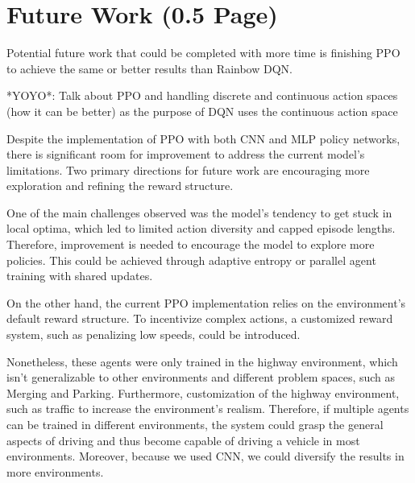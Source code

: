 \documentclass{article}
\begin{document}
\section{Future Work (0.5 Page)}


Potential future work that could be completed with more time is finishing PPO to achieve the same or better results than Rainbow DQN.

*YOYO*: Talk about PPO and handling discrete and continuous action spaces (how it can be better)
as the purpose of DQN uses the continuous action space 

Despite the implementation of PPO with both CNN and MLP policy networks, there is significant room for improvement to address the current model's limitations. Two primary directions for future work are encouraging more exploration and refining the reward structure.

One of the main challenges observed was the model's tendency to get stuck in local optima, which led to limited action diversity and capped episode lengths. Therefore, improvement is needed to encourage the model to explore more policies. This could be achieved through adaptive entropy or parallel agent training with shared updates.

On the other hand, the current PPO implementation relies on the environment's default reward structure. To incentivize complex actions, a customized reward system, such as penalizing low speeds, could be introduced.

Nonetheless, these agents were only trained in the highway environment, which isn't generalizable to other environments and different problem spaces, such as Merging and Parking.
Furthermore, customization of the highway environment, such as traffic \cite{} to increase the environment's realism.
Therefore, if multiple agents can be trained in different environments, the system could grasp the general aspects of driving and thus become capable of driving a vehicle in most environments.
Moreover, because we used CNN, we could diversify the results in more environments.


\newpage
 
 

\normalsize
\end{document}

